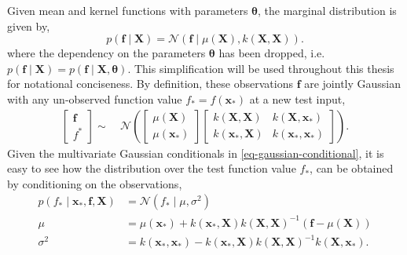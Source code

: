 \documentclass{mimosis-class/mimosis}
\numberwithin{equation}{chapter}
\newcommand{\f}{\ensuremath{\mathbf{f}}}
\begin{document}
Given mean and kernel functions with parameters \(\bm\theta\), the marginal distribution is given by,
\begin{equation} \label{eq-gp-prior}
p(\mathbf{f} \mid \mathbf{X}) = \mathcal{N}(\mathbf{f} \mid \mu(\mathbf{X}), k(\mathbf{X}, \mathbf{X})).
\end{equation}
where the dependency on the parameters \(\bm\theta\) has been dropped, i.e.
\(p(\f \mid \mathbf{X}) = p(\f \mid \mathbf{X}, \bm\theta)\).
This simplification will be used throughout this thesis for notational conciseness.
By definition, these observations \(\mathbf{f}\) are jointly Gaussian with any un-observed function value
\(f_* = f(\mathbf{x}_*)\) at a new test input,
\begin{align*} \label{eq-gp-joint}
\left[\begin{array}{c}
      \mathbf{f} \\
      f^{*}
\end{array}\right]
\sim\ &\mathcal{N}\left(
\left[\begin{array}{c}
      \mu(\mathbf{X}) \\
      \mu(\mathbf{x}_{*})
 \end{array}\right]
\left[\begin{array}{cc}
      k(\mathbf{X}, \mathbf{X}) & k(\mathbf{X},\mathbf{x}_{*}) \\
      k(\mathbf{x}_{*},\mathbf{X}) & k(\mathbf{x}_{*},\mathbf{x}_{*})
 \end{array}\right]\right).
\end{align*}
Given the multivariate Gaussian conditionals in \cref{eq-gaussian-conditional}, it is easy to see how
the distribution over the test function value \(f_*\),
can be obtained by conditioning on the observations,
\begin{align} \label{eq-gp-prediction}
p(f_{*} \mid \mathbf{x}_*, \mathbf{f}, \mathbf{X}) &= \mathcal{N}(f_* \mid \mu, \sigma^2)  \\
\mu &= \mu(\mathbf{x}_*) + k(\mathbf{x}_*, \mathbf{X}) k(\mathbf{X}, \mathbf{X})^{-1} (\mathbf{f} - \mu(\mathbf{X})) \nonumber\\
\sigma^2 &= k(\mathbf{x}_*, \mathbf{x}_*) - k(\mathbf{x}_*, \mathbf{X}) k(\mathbf{X}, \mathbf{X})^{-1} k(\mathbf{X}, \mathbf{x}_*). \nonumber
\end{align}
\end{document}
